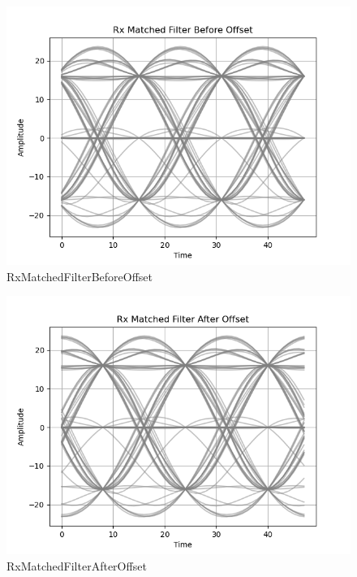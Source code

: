 \documentclass[
	letterpaper, %
	10pt, %
]{CSUniSchoolLabReport}
\begin{document}
\begin{figure}[H] %
	\centering %
	\includegraphics[width=1.2\textwidth]{assignment3a.png} %
	\caption{RxMatchedFilterBeforeOffset}
	\label{fig:block}
\end{figure}

\begin{figure}[H] %
	\centering %
	\includegraphics[width=1.2\textwidth]{assignment3b.png} %
	\caption{RxMatchedFilterAfterOffset}
	\label{fig:block}
\end{figure}
\end{document}
